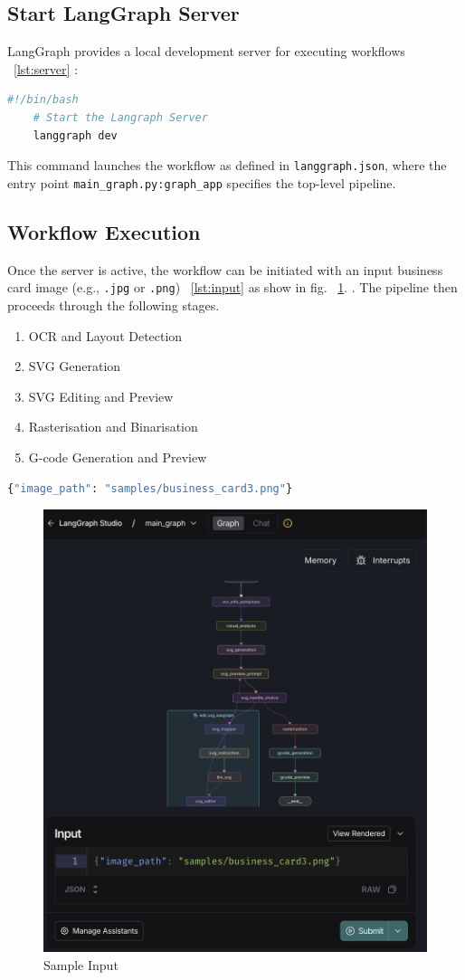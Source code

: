 \subsection{Start LangGraph Server}
LangGraph provides a local development server for executing workflows ~\ref{lst:server} :
\begin{lstlisting}[language=bash,caption={Langgraph Server}, label={lst:server}]
	#!/bin/bash
	# Start the Langraph Server
	langgraph dev
\end{lstlisting}

This command launches the workflow as defined in \texttt{langgraph.json}, where the entry point \texttt{main\_graph.py:graph\_app} specifies the top-level pipeline.

\subsection{Workflow Execution}
Once the server is active, the workflow can be initiated with an input business card image (e.g., \texttt{.jpg} or \texttt{.png}) ~\ref{lst:input} as show in fig. ~\ref{Input}. . The pipeline then proceeds through the following stages. 

\begin{enumerate}
	\item OCR and Layout Detection
	\item SVG Generation
	\item SVG Editing and Preview
	\item Rasterisation and Binarisation
	\item G-code Generation and Preview
\end{enumerate}

\begin{lstlisting}[language=bash,caption={Sample Input},label={lst:input}]
	{"image_path": "samples/business_card3.png"}
\end{lstlisting}

\begin{figure}
	\begin{center}
		\includegraphics[width=0.6\linewidth]{Images/Input.png}
		\caption{Sample Input}
		\label{Input} 
	\end{center}
\end{figure}


